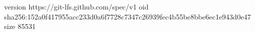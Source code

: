 version https://git-lfs.github.com/spec/v1
oid sha256:152a0f417955acc233d0a6f7728c7347c26939fec4b55be8bbe6ec1e943d0e47
size 85531
